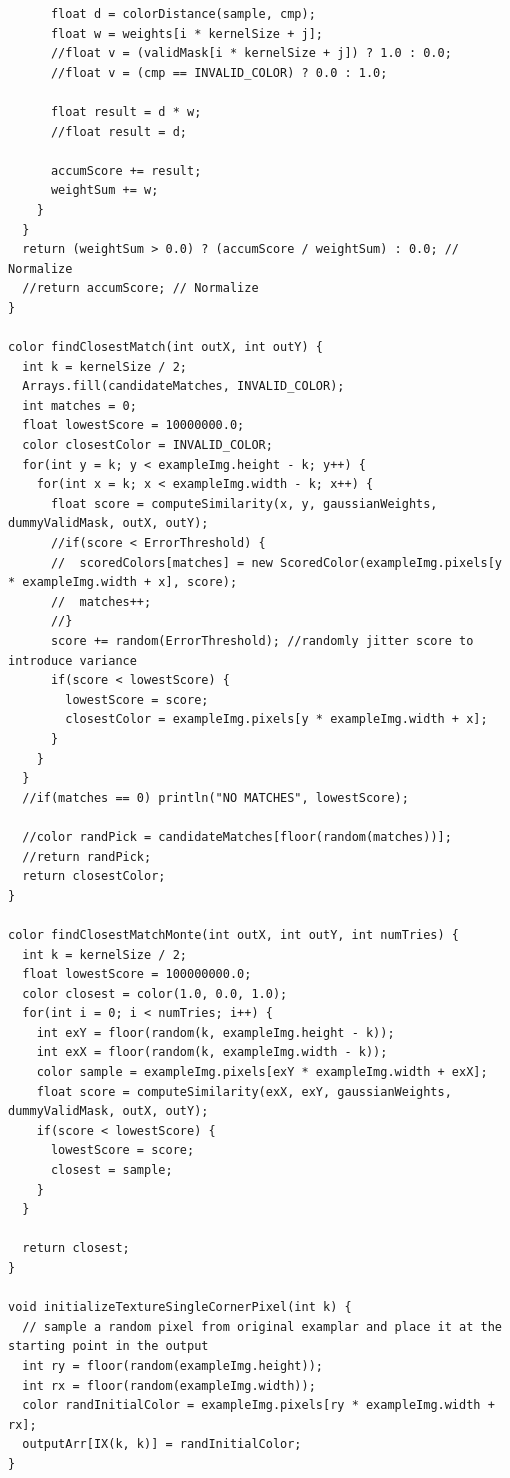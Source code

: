 \documentclass[a4paper, 11pt, titlepage]{article}
\begin{document}
\begin{lstlisting}
      float d = colorDistance(sample, cmp);
      float w = weights[i * kernelSize + j];
      //float v = (validMask[i * kernelSize + j]) ? 1.0 : 0.0;
      //float v = (cmp == INVALID_COLOR) ? 0.0 : 1.0;

      float result = d * w;
      //float result = d;
      
      accumScore += result;
      weightSum += w;
    }
  }
  return (weightSum > 0.0) ? (accumScore / weightSum) : 0.0; // Normalize
  //return accumScore; // Normalize
}

color findClosestMatch(int outX, int outY) {
  int k = kernelSize / 2;
  Arrays.fill(candidateMatches, INVALID_COLOR);
  int matches = 0;
  float lowestScore = 10000000.0;
  color closestColor = INVALID_COLOR;
  for(int y = k; y < exampleImg.height - k; y++) {
    for(int x = k; x < exampleImg.width - k; x++) {
      float score = computeSimilarity(x, y, gaussianWeights, dummyValidMask, outX, outY);
      //if(score < ErrorThreshold) {
      //  scoredColors[matches] = new ScoredColor(exampleImg.pixels[y * exampleImg.width + x], score);
      //  matches++;
      //}
      score += random(ErrorThreshold); //randomly jitter score to introduce variance
      if(score < lowestScore) {
        lowestScore = score;
        closestColor = exampleImg.pixels[y * exampleImg.width + x];
      }
    }
  }
  //if(matches == 0) println("NO MATCHES", lowestScore);
  
  //color randPick = candidateMatches[floor(random(matches))];
  //return randPick;
  return closestColor;
}

color findClosestMatchMonte(int outX, int outY, int numTries) {
  int k = kernelSize / 2;
  float lowestScore = 100000000.0;
  color closest = color(1.0, 0.0, 1.0);
  for(int i = 0; i < numTries; i++) {
    int exY = floor(random(k, exampleImg.height - k));
    int exX = floor(random(k, exampleImg.width - k));
    color sample = exampleImg.pixels[exY * exampleImg.width + exX];
    float score = computeSimilarity(exX, exY, gaussianWeights, dummyValidMask, outX, outY);
    if(score < lowestScore) {
      lowestScore = score;
      closest = sample;
    }
  }

  return closest;
}

void initializeTextureSingleCornerPixel(int k) {
  // sample a random pixel from original examplar and place it at the starting point in the output
  int ry = floor(random(exampleImg.height));
  int rx = floor(random(exampleImg.width));
  color randInitialColor = exampleImg.pixels[ry * exampleImg.width + rx];
  outputArr[IX(k, k)] = randInitialColor;
}


\end{lstlisting}
\end{document}
